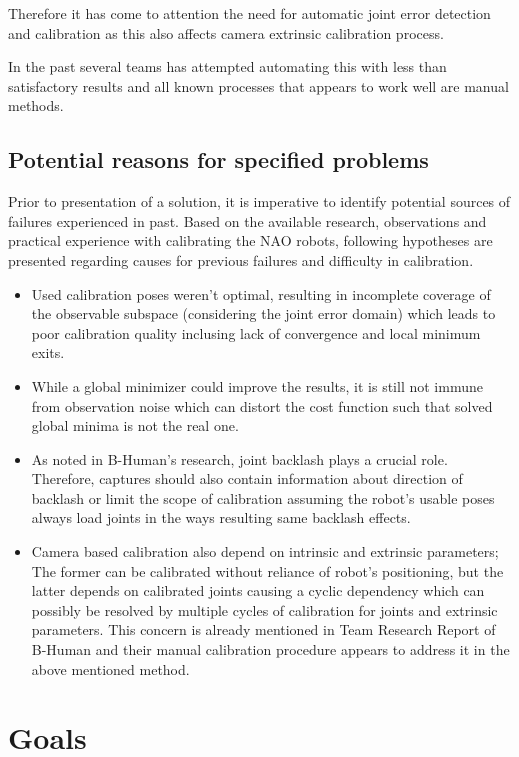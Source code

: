 \documentclass[english, printversion, nomenclature, notitle]{tuvisionthesis} %
\begin{document}
Therefore it has come to attention the need for automatic joint error detection and calibration as this also affects camera extrinsic calibration process.

In the past several teams has attempted automating this with less than satisfactory results and all known processes that appears to work well are manual methods. 

\subsection{Potential reasons for specified problems}
Prior to presentation of a solution, it is imperative to identify potential sources of failures experienced in past. Based on the available research, observations and practical experience with calibrating the NAO robots, following hypotheses are presented regarding causes for previous failures and difficulty in calibration.

\begin{itemize}
	\label{itemize:possible_reasons}
	\item Used calibration poses weren't optimal, resulting in incomplete coverage of the observable subspace (considering the joint error domain) which leads to poor calibration quality inclusing lack of convergence and local minimum exits.
	\item While a global minimizer could improve the results, it is still not immune from observation noise which can distort the cost function such that solved global minima is not the real one.
	\item As noted in B-Human's research, joint backlash plays a crucial role. Therefore, captures should also contain information about direction of backlash or limit the scope of calibration assuming the robot's usable poses always load joints in the ways resulting same backlash effects.
	\item Camera based calibration also depend on intrinsic and extrinsic parameters; The former can be calibrated without reliance of robot's positioning, but the latter depends on calibrated joints causing a cyclic dependency which can possibly be resolved by multiple cycles of calibration for joints and extrinsic parameters. This concern is already mentioned in Team Research Report of B-Human and their manual calibration procedure appears to address it in the above mentioned method.
\end{itemize}

\section{Goals}
\end{document}
